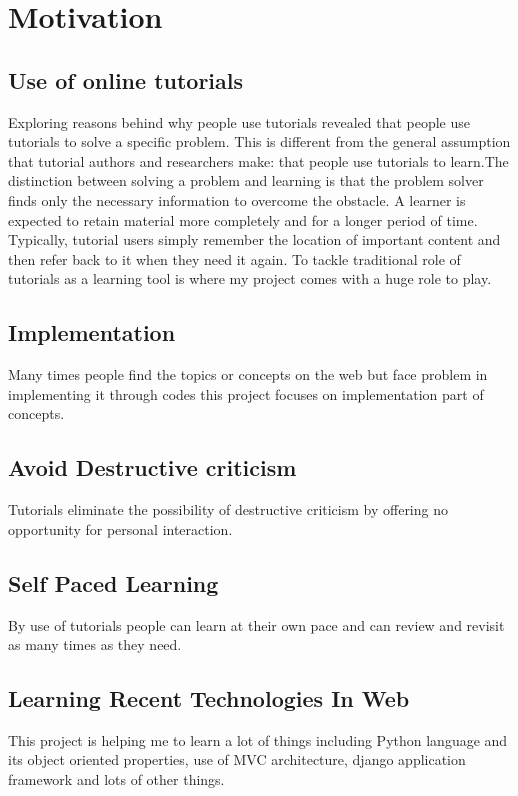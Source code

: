 \chapter{Motivation}
\section{Use of online tutorials}
Exploring reasons behind why people use tutorials revealed
that people use tutorials to solve a specific problem. This
is different from the general assumption that tutorial authors
and researchers make: that people use tutorials to learn.The
distinction between solving a problem and learning is that
the problem solver finds only the necessary information to
overcome the obstacle. A learner is expected to retain material
more completely and for a longer period of time. Typically,
tutorial users simply remember the location of important
content and then refer back to it when they need it again. To
tackle traditional role of tutorials as a learning tool is where
my project comes with a huge role to play.

\section{Implementation}
Many times people find the topics or concepts on the web
but face problem in implementing it through codes this project
focuses on implementation part of concepts.

\section{Avoid Destructive criticism}
Tutorials eliminate the possibility of destructive criticism by
offering no opportunity for personal interaction.

\section{Self Paced Learning}
By use of tutorials people can learn at their own pace and
can review and revisit as many times as they need.

\section{Learning Recent Technologies In Web}
This project is helping me to learn a lot of things including
Python language and its object oriented properties, use of
MVC architecture, django application framework and lots of
other things.